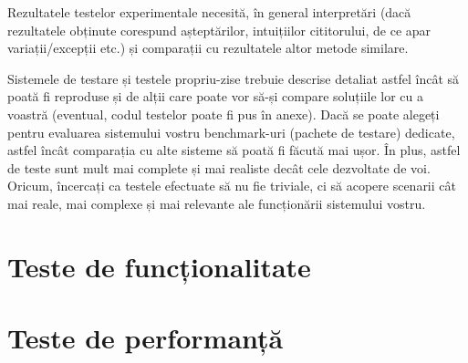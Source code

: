 Rezultatele testelor experimentale necesită, în general interpretări (dacă rezultatele obținute corespund așteptărilor, intuițiilor cititorului, de ce apar variații/excepții etc.) și comparații cu rezultatele altor metode similare. 

Sistemele de testare și testele propriu-zise trebuie descrise detaliat astfel încât să poată fi reproduse și de alții care poate vor să-și compare soluțiile lor cu a voastră (eventual, codul testelor poate fi pus în anexe). Dacă se poate alegeți pentru evaluarea sistemului vostru benchmark-uri (pachete de testare) dedicate, astfel încât comparația cu alte sisteme să poată fi făcută mai ușor. În plus, astfel de teste sunt mult mai complete și mai realiste decât cele dezvoltate de voi. Oricum, încercați ca testele efectuate să nu fie triviale, ci să acopere scenarii cât mai reale, mai complexe și mai relevante ale funcționării sistemului vostru. 

\section{Teste de funcționalitate}



\section{Teste de performanță}